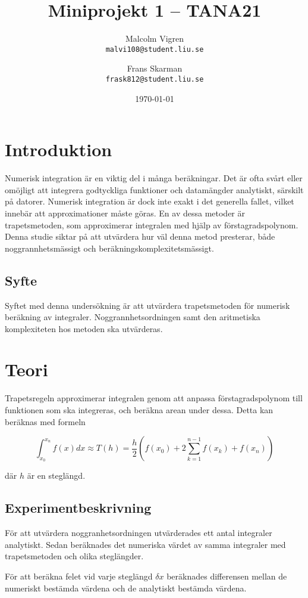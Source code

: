 \documentclass[a4paper,titlepage]{article}
\title{
    \textbf{Miniprojekt 1 -- TANA21}}
\date{\today}
\author{%
    Malcolm Vigren \\
    \texttt{malvi108@student.liu.se}
    \and
    Frans Skarman\\
    \texttt{frask812@student.liu.se}
    }
\begin{document}
\maketitle
\newpage
\tableofcontents
\newpage

\section{Introduktion}
Numerisk integration är en viktig del i många beräkningar. Det är ofta svårt
eller omöjligt att integrera godtyckliga funktioner och datamängder analytiskt,
särskilt på datorer. Numerisk integration är dock inte exakt i det generella
fallet, vilket innebär att approximationer måste göras. En av dessa metoder
är trapetsmetoden, som approximerar integralen med hjälp av förstagradspolynom.
Denna studie siktar på att utvärdera hur väl denna metod presterar,
både noggrannhetsmässigt och beräkningskomplexitetsmässigt.

\subsection{Syfte}
Syftet med denna undersökning är att utvärdera trapetsmetoden för numerisk
beräkning av integraler. Noggrannhetsordningen samt den aritmetiska
komplexiteten hos metoden ska utvärderas.

\section{Teori}
Trapetsregeln approximerar integralen genom att anpassa förstagradspolynom till
funktionen som ska integreras, och beräkna arean under dessa. Detta kan
beräknas med formeln

\begin{equation}
    \int_{x_0}^{x_n}f(x)dx \approx T(h) = \frac{h}{2}(f(x_0) +
    2\sum_{k=1}^{n-1}f(x_k) + f(x_n))
\end{equation}

där $h$ är en steglängd.

\subsection{Experimentbeskrivning}

För att utvärdera noggranhetsordningen utvärderades ett antal integraler
analytiskt. Sedan beräknades det numeriska värdet av samma integraler med
trapetsmetoden och olika steglängder.

För att beräkna felet vid varje steglängd $\delta x$ beräknades differensen mellan de numeriskt
bestämda värdena och de analytiskt bestämda värdena.
\end{document}
